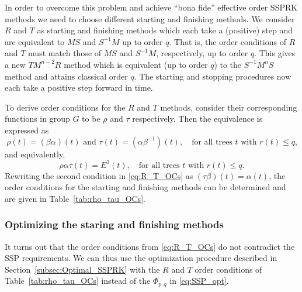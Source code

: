 In order to overcome this problem and achieve ``bona fide'' effective order SSPRK methods we 
need to choose different starting and finishing methods. 
We consider $R$ and $T$ as starting and finishing methods which each take a (positive) step
and are equivalent to $MS$ and $S^{-1}M$ up to order $q$.
That is, the order conditions of $R$ and $T$ must match those of
$MS$ and $S^{-1}M$, respectively, up to order $q$.
This gives a new $TM^{n-2}R$ method which is equivalent (up to order $q$) to the
$S^{-1}M^nS$ method and attains classical order $q$.
The starting and stopping procedures now each take a positive step
forward in time.

To derive order conditions for the $R$ and $T$ methods, consider their
corresponding functions in group $G$ to be $\rho$ and $\tau$
respectively.
Then the equivalence is expressed as
\begin{equation} \label{eq:R_T_OCs}
    \rho(t) = (\beta\alpha)(t) \text{ and } \tau(t) = (\alpha\beta^{-1})(t), \quad \text{for all 
    trees $t$ with $r(t) \leq q$,}
\end{equation}
and equivalently,
\begin{equation} \label{eq:RMT_OCs}
    \rho\alpha\tau(t) = E^3(t), \quad \text{for all trees $t$ with $r(t) \leq q$.}
\end{equation}
Rewriting the second condition in \eqref{eq:R_T_OCs} as $(\tau\beta)(t) = \alpha(t)$, the 
order conditions for the starting and finishing methods can be determined and are given in
Table~\ref{tab:rho_tau_OCs}.



\subsubsection{Optimizing the staring and finishing methods}\label{subsubsec:opt_methods}

It turns out that the order conditions from \eqref{eq:R_T_OCs} do not
contradict the SSP requirements.
We can thus use the optimization procedure described in
Section~\ref{subsec:Optimal_SSPRK} with the $R$ and $T$ order
conditions of Table~\ref{tab:rho_tau_OCs} instead of the $\Phi_{p,q}$
in \eqref{eq:SSP_opt}.


